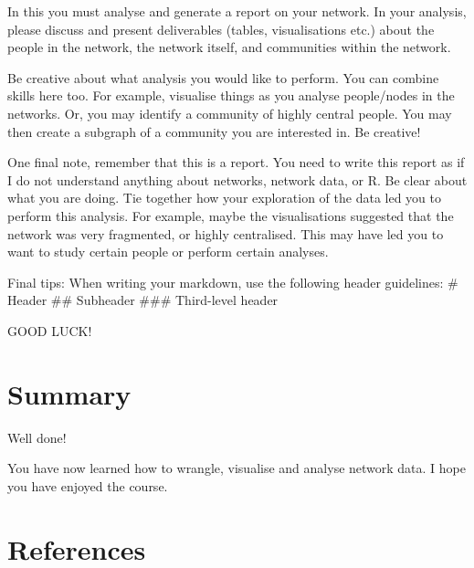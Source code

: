 \documentclass[
  letterpaper,
  DIV=11,
  numbers=noendperiod]{scrreprt}
\newlength{\cslhangindent}
\newenvironment{CSLReferences}[2] %
 {\begin{list}{}{%
  \setlength{\itemindent}{0pt}
  \setlength{\leftmargin}{0pt}
  \setlength{\parsep}{0pt}
  \ifodd #1
   \setlength{\leftmargin}{\cslhangindent}
   \setlength{\itemindent}{-1\cslhangindent}
  \fi
  \setlength{\itemsep}{#2\baselineskip}}}
 {\end{list}}
\begin{document}
In this you must analyse and generate a report on your network. In your
analysis, please discuss and present deliverables (tables,
visualisations etc.) about the people in the network, the network
itself, and communities within the network.

Be creative about what analysis you would like to perform. You can
combine skills here too. For example, visualise things as you analyse
people/nodes in the networks. Or, you may identify a community of highly
central people. You may then create a subgraph of a community you are
interested in. Be creative!

One final note, remember that this is a report. You need to write this
report as if I do not understand anything about networks, network data,
or R. Be clear about what you are doing. Tie together how your
exploration of the data led you to perform this analysis. For example,
maybe the visualisations suggested that the network was very fragmented,
or highly centralised. This may have led you to want to study certain
people or perform certain analyses.

Final tips: When writing your markdown, use the following header
guidelines: \# Header \#\# Subheader \#\#\# Third-level header

GOOD LUCK!


\chapter{Summary}\label{summary}

Well done!

You have now learned how to wrangle, visualise and analyse network data.
I hope you have enjoyed the course.


\chapter*{References}\label{references}


\label{refs}
\begin{CSLReferences}{0}{1}
\end{CSLReferences}
\end{document}
